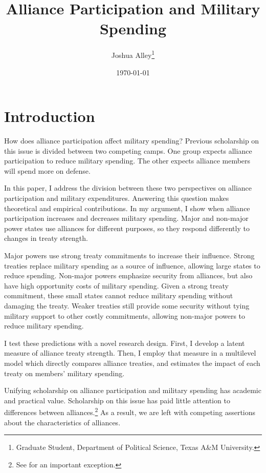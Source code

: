 \documentclass[12pt]{article}
\title{\textbf{Alliance Participation and Military Spending}}
\author{Joshua Alley\footnote{Graduate Student,
Department of Political Science, Texas A\&M University.}}
\date{{\normalsize \today}}
\begin{document}
\maketitle 

\newpage 

\doublespace 

\begin{abstract}



\end{abstract}



\section{Introduction}


How does alliance participation affect military spending? 
Previous scholarship on this issue is divided between two competing camps. 
One group expects alliance participation to reduce military spending. 
The other expects alliance members will spend more on defense. 


In this paper, I address the division between these two perspectives on alliance participation and military expenditures. 
Answering this question makes theoretical and empirical contributions. 
In my argument, I show when alliance participation increases and decreases military spending. 
Major and non-major power states use alliances for different purposes, so they respond differently to changes in treaty strength.


Major powers use strong treaty commitments to increase their influence. 
Strong treaties replace military spending as a source of influence, allowing large states to reduce spending. 
Non-major powers emphasize security from alliances, but also have high opportunity costs of military spending.  
Given a strong treaty commitment, these small states cannot reduce military spending without damaging the treaty. 
Weaker treaties still provide some security without tying military support to other costly commitments, allowing non-major powers to reduce military spending. 


I test these predictions with a novel research design.
First, I develop a latent measure of alliance treaty strength. 
Then, I employ that measure in a multilevel model which directly compares alliance treaties, and estimates the impact of each treaty on members' military spending.  


Unifying scholarship on alliance participation and military spending has academic and practical value.
Scholarship on this issue has paid little attention to differences between alliances.\footnote{See \citet{DigiuseppePoast2016} for an important exception.} 
As a result, we are left with competing assertions about the characteristics of alliances. 
\end{document}
